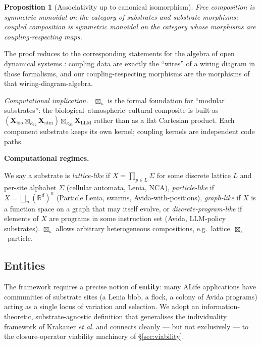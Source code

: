 \documentclass[journal]{IEEEtran}
\theoremstyle{plain}
\newtheorem{proposition}[theorem]{Proposition}
\theoremstyle{definition}
\theoremstyle{plain}
\newenvironment{implnote}[1][Computational implication]{%
  \par\smallskip\noindent\emph{#1.}\ }{\par\smallskip}
\newcounter{topic}[subsection]
\newcommand{\topic}[1]{%
  \refstepcounter{topic}%
  \par\smallskip\noindent\textbf{#1.}\ }
\newcommand{\R}{\mathbb{R}}
\newcommand{\X}{\mathbf{X}}
\begin{document}
\begin{proposition}[Associativity up to canonical isomorphism]
Free composition is symmetric monoidal on the category of substrates and
substrate morphisms; coupled composition is symmetric monoidal on the
category whose morphisms are coupling-respecting maps.
\end{proposition}

The proof reduces to the corresponding statements for the algebra of open
dynamical systems \cite{vagner2015algebras,schultz2020sheaves,myers2021double}:
coupling data are exactly the ``wires''
of a wiring diagram in those formalisms, and our coupling-respecting
morphisms are the morphisms of that wiring-diagram-algebra.

\begin{implnote}[Computational implication]
$\boxtimes_\kappa$ is the formal foundation for ``modular substrates'': the
biological--atmospheric--cultural composite is built as
$(\X_{\mathrm{bio}} \boxtimes_{\kappa_{12}} \X_{\mathrm{atm}}) \boxtimes_{\kappa_{23}} \X_{\mathrm{LLM}}$
rather than as a flat Cartesian product. Each component substrate keeps its
own kernel; coupling kernels are independent code paths.
\end{implnote}

\topic{Computational regimes}

We say a substrate is \emph{lattice-like} if $X = \prod_{p\in L}\Sigma$ for
some discrete lattice $L$ and per-site alphabet $\Sigma$ (cellular automata,
Lenia, NCA), \emph{particle-like} if $X = \bigsqcup_n (\R^d)^n$ (Particle
Lenia, swarms, Avida-with-positions), \emph{graph-like} if $X$ is a function
space on a graph that may itself evolve, or \emph{discrete-program-like} if
elements of $X$ are programs in some instruction set (Avida, LLM-policy
substrates). $\boxtimes_\kappa$ allows arbitrary heterogeneous compositions,
e.g.\ lattice~$\boxtimes_\kappa$~particle.

\subsection{Entities}\label{sec:entities}

The framework requires a precise notion of \textbf{entity}: many
ALife applications have communities of substrate sites (a Lenia blob, a
flock, a colony of Avida programs) acting as a single locus of variation and
selection. We adopt an information-theoretic, substrate-agnostic definition
that generalises the individuality framework of Krakauer \emph{et al.}
\cite{krakauer2020individuality} and
connects cleanly --- but not exclusively --- to the closure-operator
viability machinery of \S\ref{sec:viability}.
\end{document}
